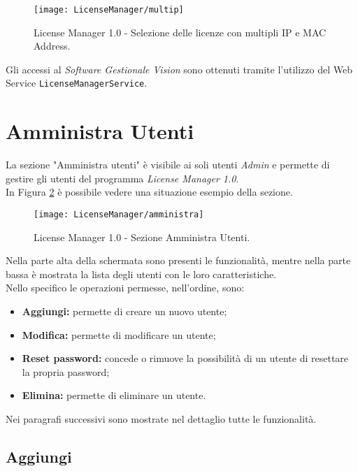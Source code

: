 \begin{figure}[!h] 
    \centering 
    \texttt{[image: LicenseManager/multip]} 
    \caption{License Manager 1.0 - Selezione delle licenze con multipli IP e MAC Address.}
\label{multip}

\end{figure}

Gli accessi al \textit{Software Gestionale Vision} sono ottenuti tramite l'utilizzo del Web Service \texttt{LicenseManagerService}.


\section{Amministra Utenti}
\label{ammut}
La sezione "Amministra utenti" è visibile ai soli utenti \textit{Admin} e permette di gestire gli utenti del programma \textit{License Manager 1.0}.\\
In Figura \ref{amm} è possibile vedere una situazione esempio della sezione.
\begin{figure}[!h] 
    \centering 
    \texttt{[image: LicenseManager/amministra]} 
    \caption{License Manager 1.0 - Sezione Amministra Utenti.}
\label{amm}

\end{figure}

Nella parte alta della schermata sono presenti le funzionalità, mentre nella parte bassa è mostrata la lista degli utenti con le loro caratteristiche.\\
Nello specifico le operazioni permesse, nell'ordine, sono:
\begin{itemize}
\item \textbf{Aggiungi:} permette di creare un nuovo utente;
\item \textbf{Modifica:} permette di modificare un utente;
\item \textbf{Reset password:} concede o rimuove la possibilità di un utente di resettare la propria password;
\item \textbf{Elimina:} permette di eliminare un utente.
\end{itemize}

Nei paragrafi successivi sono mostrate nel dettaglio tutte le funzionalità. 

\subsection{Aggiungi}


